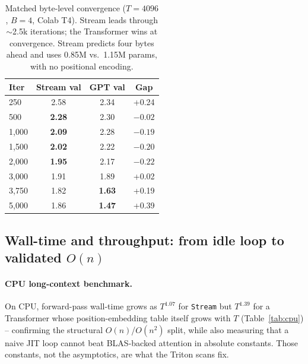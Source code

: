 \documentclass[11pt]{article}
\newcommand{\Stream}{\texttt{Stream}}
\begin{document}
\begin{table}[t]
  \centering
  \small
  \begin{tabular}{lccc}
    \toprule
    Iter & Stream val & GPT val & Gap \\
    \midrule
    250   & 2.58 & 2.34 & +0.24 \\
    500   & \textbf{2.28} & 2.30 & $-0.02$ \\
    1{,}000 & \textbf{2.09} & 2.28 & $-0.19$ \\
    1{,}500 & \textbf{2.02} & 2.22 & $-0.20$ \\
    2{,}000 & \textbf{1.95} & 2.17 & $-0.22$ \\
    3{,}000 & 1.91 & 1.89 & +0.02 \\
    3{,}750 & 1.82 & \textbf{1.63} & +0.19 \\
    5{,}000 & 1.86 & \textbf{1.47} & +0.39 \\
    \bottomrule
  \end{tabular}
  \caption{Matched byte-level convergence ($T{=}4096$, $B{=}4$, Colab T4).
  Stream leads through $\sim$2.5k iterations; the Transformer wins at
  convergence. Stream predicts four bytes ahead and uses 0.85M vs.\ 1.15M
  params, with no positional encoding.}
  \label{tab:head2head}
\end{table}

\subsection{Wall-time and throughput: from idle loop to validated $O(n)$}\label{sec:gpu}

\paragraph{CPU long-context benchmark.}
On CPU, forward-pass wall-time grows as $T^{1.07}$ for \Stream{} but $T^{1.39}$
for a Transformer whose position-embedding table itself grows with $T$
(Table~\ref{tab:cpu}) -- confirming the structural $O(n)$/$O(n^2)$ split, while
also measuring that a naive JIT loop cannot beat BLAS-backed attention in
absolute constants. Those constants, not the asymptotics, are what the Triton
scans fix.
\end{document}
